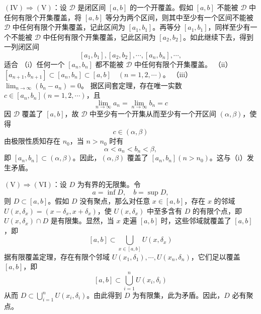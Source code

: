 $(\mathrm{IV}) \Rightarrow(\mathrm{V})$：设 $\mathscr{D}$ 是闭区间 $[a, b]$ 的一个开覆盖。假如 $[a, b]$ 不能被 $\mathscr{D}$ 中任何有限个开集覆盖，将 $[a, b]$ 等分为两个区间，则其中至少有一个区间不能被 $\mathscr{D}$ 中任何有限个开集覆盖，记此区间为 $\left[a_1, b_1\right]$。再等分 $\left[a_1, b_1\right]$，同样至少有一个不能被 $\mathscr{D}$ 中任何有限个开集覆盖，记此区间为 $\left[a_2, b_2\right]$。如此继续下去，得到一列闭区间
\[
\left[a_1, b_1\right],\left[a_2, b_2\right], \cdots,\left[a_n, b_n\right], \cdots,
\]
适合
（i）任何一个 $\left[a_n, b_n\right]$ 都不能被 $\mathscr{D}$ 中任何有限个开集覆盖。
（ii）$\left[a_{n+1}, b_{n+1}\right] \subset\left[a_n, b_n\right] \subset[a, b] \quad(n=1,2, \cdots)$。
（iii）$\lim_{n \rightarrow \infty}\left(b_n-a_n\right)=0$。
据区间套定理，存在唯一实数 $c \in\left[a_n, b_n\right](n=1,2, \cdots)$，且
\[
\lim_{n \rightarrow \infty} a_n=\lim_{n \rightarrow \infty} b_n=c
\]
因 $\mathscr{D}$ 覆盖了 $[a, b]$，故 $\mathscr{D}$ 中至少有一个开集从而至少有一个开区间 $(\alpha, \beta)$，使得
\[
c \in(\alpha, \beta)
\]
由极限性质知存在 $n_0$，当 $n>n_0$ 时有
\[
\alpha<a_n<b_n<\beta,
\]
即 $\left[a_n, b_n\right] \subset(\alpha, \beta)$。因此，$(\alpha, \beta)$ 覆盖了 $\left[a_n, b_n\right]\left(n>n_0\right)$。这与（i）发生矛盾。

$(\mathrm{V}) \Rightarrow(\mathrm{VI})$：设 $D$ 为有界的无限集。令
\[
a=\inf D, \quad b=\sup D,
\]
则 $D \subset[a, b]$。假如 $D$ 没有聚点，那么对任意 $x \in[a, b]$，存在 $x$ 的邻域 $U\left(x, \delta_x\right)=\left(x-\delta_x, x+\delta_x\right)$，使 $U\left(x, \delta_x\right)$ 中至多含有 $D$ 的有限个点，即 $U\left(x, \delta_x\right) \cap D$ 是有限集。显然，当 $x$ 走遍 $[a, b]$ 时，这些邻域就覆盖了 $[a, b]$，即
\[
[a, b] \subset \bigcup_{x \in[a, b]} U\left(x, \delta_x\right)
\]
据有限覆盖定理，存在有限个邻域 $U\left(x_1, \delta_1\right), \cdots, U\left(x_n, \delta_n\right)$，它们足以覆盖 $[a, b]$，即
\[
[a, b] \subset \bigcup_{i=1}^n U\left(x_i, \delta_i\right)
\]
从而 $D \subset \bigcup_{i=1}^n U\left(x_i, \delta_i\right)$。由此得到 $D$ 为有限集，此为矛盾。因此，$D$ 必有聚点。

